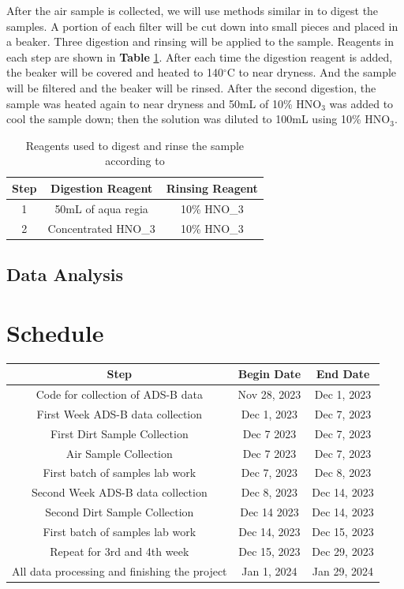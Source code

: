 \documentclass[12pt]{article}
\begin{document}
After the air sample is collected, we will use methods similar in \cite{gharaibeh_determination_2010} to digest the samples. A portion of each filter will be cut down into small pieces and placed in a beaker. Three digestion and rinsing will be applied to the sample. Reagents in each step are shown in \textbf{Table} \ref{tab:steps}. After each time the digestion reagent is added, the beaker will be covered and heated to 140$^{\circ}$C to near dryness. And the sample will be filtered and the beaker will be rinsed. After the second digestion, the sample was heated again to near dryness and 50mL of 10\% HNO$_{3}$ was added to cool the sample down; then the solution was diluted to 100mL using 10\% HNO$_{3}$. \cite{gharaibeh_determination_2010}
\begin{table}[]
    \centering
    \begin{tabular}{|c|c|c|}
    \hline
    Step & Digestion Reagent & Rinsing Reagent \\ \hline
    1 & 50mL of aqua regia & 10\% HNO_{3} \\ \hline
    2 & Concentrated HNO_{3} & 10\% HNO_{3} \\ \hline 
    \end{tabular}
    \caption{Reagents used to digest and rinse the sample according to \cite{gharaibeh_determination_2010}}
    \label{tab:steps}
\end{table}
\subsection{Data Analysis}
\section{Schedule}
\begin{center}
\begin{tabular}{|c|c|c|}
 \hline
 \textbf{Step} & \textbf{Begin Date} & \textbf{End Date} \\
 \hline \hline
Code for collection of ADS-B data & Nov 28, 2023 & Dec 1, 2023 \\
\hline
First Week ADS-B data collection & Dec 1, 2023 & Dec 7, 2023 \\
\hline
First Dirt Sample Collection & Dec 7 2023 & Dec 7, 2023 \\
\hline
Air Sample Collection & Dec 7 2023 & Dec 7, 2023 \\
\hline
First batch of samples lab work & Dec 7, 2023 & Dec 8, 2023 \\ 
\hline
Second Week ADS-B data collection & Dec 8, 2023 & Dec 14, 2023 \\
\hline
Second Dirt Sample Collection & Dec 14 2023 & Dec 14, 2023 \\
\hline
First batch of samples lab work & Dec 14, 2023 & Dec 15, 2023 \\ 
\hline
Repeat for 3rd and 4th week & Dec 15, 2023 & Dec 29, 2023\\
\hline
All data processing and finishing the project& Jan 1, 2024 & Jan 29, 2024\\
\hline
\end{tabular}
\end{center}
\end{document}
